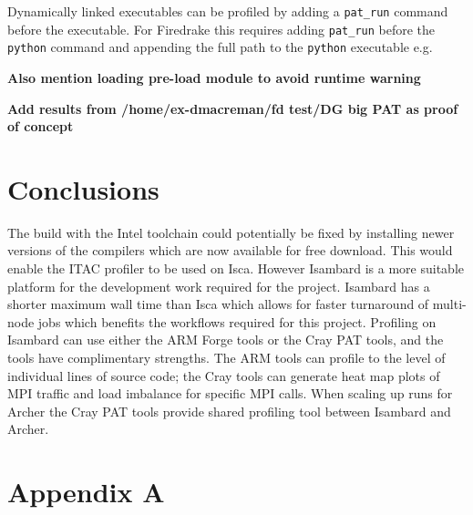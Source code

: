 \documentclass[a4paper,titlepage]{article}
\begin{document}
Dynamically linked executables can be profiled by adding a \verb+pat_run+ command before the executable. For Firedrake this requires adding \verb+pat_run+ before the \verb+python+ command and appending the full path to the \verb+python+ executable e.g.

\textbf{Also mention loading pre-load module to avoid runtime warning}

\textbf{Add results from /home/ex-dmacreman/fd test/DG big PAT as proof of concept}


\section{Conclusions}
\label{section:conclusions}

The build with the Intel toolchain could potentially be fixed by installing newer versions of the compilers which are now available for free download. This would enable the ITAC profiler to be used on Isca. However Isambard is a more suitable platform for the development work required for the project. Isambard has a shorter maximum wall time than Isca which allows for faster turnaround of multi-node jobs which benefits the workflows required for this project. Profiling on Isambard can use either the ARM Forge tools or the Cray PAT tools, and the tools have complimentary strengths. The ARM tools can profile to the level of individual lines of source code; the Cray tools can generate heat map plots of MPI traffic and load imbalance for specific MPI calls. When scaling up runs for Archer the Cray PAT tools provide shared profiling tool between Isambard and Archer. 

\pagebreak


\section*{Appendix A}
\label{appendixA}

\end{document}
